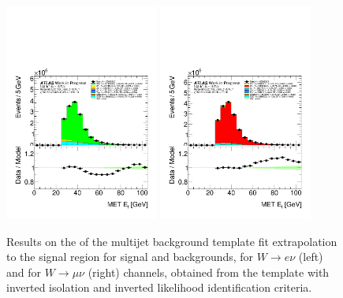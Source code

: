 \begin{figure}[h]
\centering
\includegraphics[width=0.45\textwidth]{figures/SR_MJ/fakeSlices-met_reco_et__M_T-AIso_AID-met_reco_et-antiIsoTight_FakeLepQual-SRafterFit-el.pdf}
\includegraphics[width=0.45\textwidth]{figures/SR_MJ/fakeSlices-met_reco_et__M_T-AIso_AID-met_reco_et-antiIsoTight_FakeLepQual-SRafterFit-mu.pdf}
\caption{
Results on the of the multijet background template fit extrapolation to the signal region for signal and backgrounds, for $W\rightarrow e\nu$ (left) and for $W\rightarrow \mu\nu$ (right) channels, obtained from the template with inverted isolation and inverted likelihood identification criteria.
}
\label{fig:SR_ff}
\end{figure}



